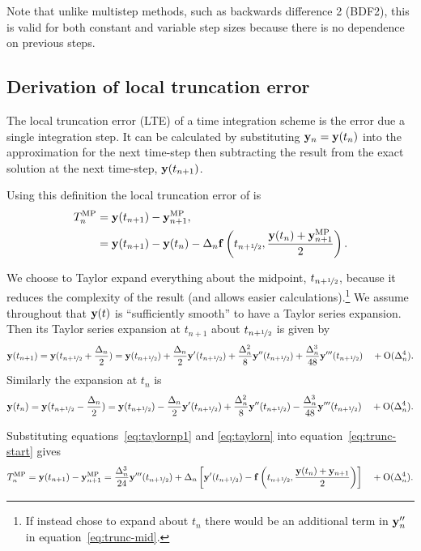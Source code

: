 Note that unlike multistep methods, such as backwards difference 2 (BDF2), this is valid for both constant and variable step sizes because there is no dependence on previous steps.


\subsection{Derivation of local truncation error}
\label{sec:deriv-local-trunc}

The local truncation error (LTE) of a time integration scheme is the error due a single integration step.
It can be calculated by substituting $\mathbf{y}_n = \mathbf{y}(t_n)$ into the approximation for the next time-step then subtracting the result from the exact solution at the next time-step, $\mathbf{y}(t_{n+1})$.

Using this definition the local truncation error of \imr is
\begin{align}
  \lte^\IMP &= \yv(t_{n+1}) - \yv_{n+1}^\IMP, \notag\\
  &= \yv(t_{n+1}) - \yv(t_n) - \dtn \fv\left( \thf, \frac{\yv(t_n) + \yv_{n+1}^\IMP}{2} \right).
  \label{eq:trunc-start}
\end{align}

We choose to Taylor expand everything about the midpoint, $t_{n+\nicefrac{1}{2}}$, because it reduces the complexity of the result (and allows easier calculations).\footnote{If instead chose to expand about $t_n$ there would be an additional term in $\mathbf{y}_n''$ in equation~\eqref{eq:trunc-mid}.}
We assume throughout that $\mathbf{y}(t)$ is ``sufficiently smooth'' to have a Taylor series expansion. Then its Taylor series expansion at $t_{n+1}$ about $t_{n+\nicefrac{1}{2}}$ is given by
\begin{equation}
  \yv(t_{n+1}) = \yv(\thf + \frac{\dtn}{2}) = \yvhf + \frac{\dtn}{2} \yvhf['] + \frac{\dtn^2}{8} \yvhf[''] + \frac{\dtn^3}{48} \yvhf['''] \porder{\dtn^4}.
  \label{eq:taylornp1}
\end{equation}
Similarly the expansion at $t_n$ is
\begin{equation}
  \yv(t_n) = \yv(\thf - \frac{\dtn}{2}) = \yvhf - \frac{\dtn}{2} \yvhf['] + \frac{\dtn^2}{8} \yvhf[''] - \frac{\dtn^3}{48} \yvhf['''] \porder{\dtn^4}.
  \label{eq:taylorn}
\end{equation}

Substituting equations~\eqref{eq:taylornp1} and \eqref{eq:taylorn} into equation~\eqref{eq:trunc-start} gives
\begin{equation}
  \lte^\IMP = \yv(t_{n+1}) - \yv_{n+1}^\IMP
  = \frac{\dtn^3}{24} \yvhf[''']  + \dtn  \left[ \yvhf[']
  - \fv\left( \thf, \frac{\yv(t_n) + \yv_{n+1}}{2} \right) \right]  \porder{\dtn^4}.
  \label{eq:trunc-mid}
\end{equation}

